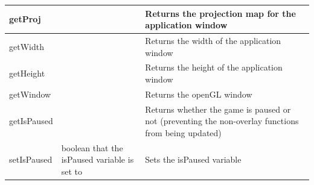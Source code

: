 \documentclass[../../Main.tex]{subfiles}
\begin{document}
\begin{center}
\begin{tabular}{ | m{} | m{}| m{} | }
            \hline
            getProj & & Returns the projection map for the application window \\
            \hline
            getWidth & & Returns the width of the application window \\
            \hline
            getHeight & & Returns the height of the application window \\
            \hline
            getWindow & & Returns the openGL window \\
            \hline
            getIsPaused & & Returns whether the game is paused or not (preventing the non-overlay functions from being updated) \\
            \hline
            setIsPaused & boolean that the isPaused variable is set to & Sets the isPaused variable \\
            \hline
        \end{tabular}
    \end{center}
\end{document}
